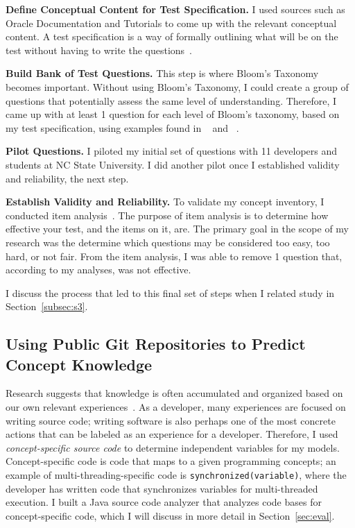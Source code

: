 \documentclass{llncs}
\begin{document}
\vspace{0.5em}
\noindent\textbf{Define Conceptual Content for Test Specification.} I used sources such as Oracle Documentation and Tutorials to come up with the relevant conceptual content. A test specification is a way of formally outlining what will be on the test without having to write the questions~\cite{tew2010developing}. 

\vspace{0.5em}

\noindent\textbf{Build Bank of Test Questions.} This step is where Bloom's Taxonomy becomes important. Without using Bloom's Taxonomy, I could create a group of questions that potentially assess the same level of understanding. Therefore, I came up with at least 1 question for each level of Bloom's taxonomy, based on my test specification, using examples found in ~\cite{nelson1967testing} and ~\cite{thompson2008bloom}.  

\vspace*{0.5em}

\noindent\textbf{Pilot Questions.} I piloted my initial set of questions with 11 developers and students at NC State University. I did another pilot once I established validity and reliability, the next step.

\vspace*{0.5em}

\noindent \textbf{Establish Validity and Reliability.} To validate my concept inventory, I conducted item analysis~\cite{gorsuch1997exploratory}. The purpose of item analysis is to determine how effective your test, and the items on it, are. The primary goal in the scope of my research was the determine which questions may be considered too easy, too hard, or not fair. From the item analysis, I was able to remove 1 question that, according to my analyses, was not effective.


I discuss the process that led to this final set of steps when I related study in Section~\ref{subsec:s3}.

\subsection{Using Public Git Repositories to Predict Concept Knowledge}
Research suggests that knowledge is often accumulated and organized based on our own relevant experiences~\cite{johnson1989mental,argote2011organizational}. As a developer, many experiences are focused on writing source code; writing software is also perhaps one of the most concrete actions that can be labeled as an experience for a developer. Therefore, I used \emph{concept-specific source code} to determine independent variables for my models. Concept-specific code is code that maps to a given programming concepts; an example of multi-threading-specific code is \texttt{synchronized(variable)}, where the developer has written code that synchronizes variables for multi-threaded execution.
I built a Java source code analyzer that analyzes code bases for concept-specific code, which I will discuss in more detail in Section~\ref{sec:eval}. 
\end{document}
